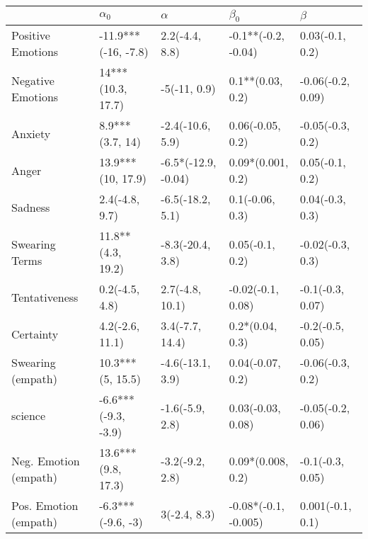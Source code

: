 \begin{tabular}{lllll}
\toprule
{} &           $\alpha_0$ &             $\alpha$ &             $\beta_0$ &            $\beta$ \\
\midrule
Positive Emotions     &  -11.9***(-16, -7.8) &       2.2(-4.4, 8.8) &   -0.1**(-0.2, -0.04) &    0.03(-0.1, 0.2) \\
Negative Emotions     &    14***(10.3, 17.7) &         -5(-11, 0.9) &      0.1**(0.03, 0.2) &  -0.06(-0.2, 0.09) \\
Anxiety               &      8.9***(3.7, 14) &     -2.4(-10.6, 5.9) &      0.06(-0.05, 0.2) &   -0.05(-0.3, 0.2) \\
Anger                 &    13.9***(10, 17.9) &  -6.5*(-12.9, -0.04) &     0.09*(0.001, 0.2) &    0.05(-0.1, 0.2) \\
Sadness               &       2.4(-4.8, 9.7) &     -6.5(-18.2, 5.1) &       0.1(-0.06, 0.3) &    0.04(-0.3, 0.3) \\
Swearing Terms        &    11.8**(4.3, 19.2) &     -8.3(-20.4, 3.8) &       0.05(-0.1, 0.2) &   -0.02(-0.3, 0.3) \\
Tentativeness         &       0.2(-4.5, 4.8) &      2.7(-4.8, 10.1) &     -0.02(-0.1, 0.08) &   -0.1(-0.3, 0.07) \\
Certainty             &      4.2(-2.6, 11.1) &      3.4(-7.7, 14.4) &       0.2*(0.04, 0.3) &   -0.2(-0.5, 0.05) \\
Swearing (empath)     &     10.3***(5, 15.5) &     -4.6(-13.1, 3.9) &      0.04(-0.07, 0.2) &   -0.06(-0.3, 0.2) \\
science               &  -6.6***(-9.3, -3.9) &      -1.6(-5.9, 2.8) &     0.03(-0.03, 0.08) &  -0.05(-0.2, 0.06) \\
Neg. Emotion (empath) &   13.6***(9.8, 17.3) &      -3.2(-9.2, 2.8) &     0.09*(0.008, 0.2) &   -0.1(-0.3, 0.05) \\
Pos. Emotion (empath) &    -6.3***(-9.6, -3) &         3(-2.4, 8.3) &  -0.08*(-0.1, -0.005) &   0.001(-0.1, 0.1) \\
\bottomrule
\end{tabular}
